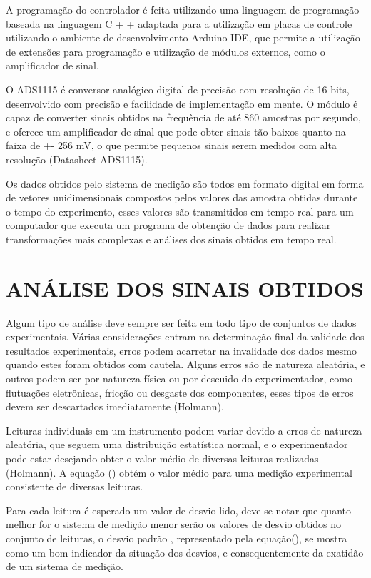 A programação do controlador é feita utilizando uma linguagem de programação baseada na linguagem C + + adaptada para a utilização em placas de controle utilizando o ambiente de desenvolvimento Arduino IDE, que permite a utilização de extensões para programação e utilização de módulos externos, como o amplificador de sinal.

O ADS1115 é conversor analógico digital de precisão com resolução de 16 bits, desenvolvido com precisão e facilidade de implementação em mente. O módulo é capaz de converter sinais obtidos na frequência de até 860 amostras por segundo, e oferece um amplificador de sinal que pode obter sinais tão baixos quanto na faixa de +- 256 mV, o que permite pequenos sinais serem medidos com alta resolução (Datasheet ADS1115).

Os dados obtidos pelo sistema de medição são todos em formato digital em forma de vetores unidimensionais compostos pelos valores das amostra obtidas durante o  tempo do experimento, esses valores são transmitidos em tempo real para um computador que executa um programa de obtenção de dados para realizar transformações mais complexas e análises dos sinais obtidos em tempo real.

\section{ANÁLISE DOS SINAIS OBTIDOS}

Algum tipo de análise deve sempre ser feita em todo tipo de conjuntos de dados experimentais. Várias considerações entram na determinação final da validade dos resultados experimentais, erros podem acarretar na invalidade dos dados mesmo quando estes foram obtidos com cautela. Alguns erros são de natureza aleatória, e outros podem ser por natureza física ou por descuido do experimentador, como flutuações eletrônicas, fricção ou desgaste dos componentes, esses tipos de erros devem ser descartados imediatamente (Holmann).

Leituras individuais em um instrumento podem variar devido a erros de natureza aleatória, que seguem uma distribuição estatística normal, e o experimentador pode estar desejando obter o valor médio de diversas leituras realizadas (Holmann). A equação () obtém o valor médio para uma medição experimental consistente de diversas leituras.

Para cada leitura é esperado um valor de desvio lido, deve se notar que quanto melhor for o sistema de medição menor serão os valores de desvio obtidos no conjunto de leituras, o desvio padrão , representado pela equação(), se mostra como um bom indicador da situação dos desvios, e consequentemente da exatidão de um sistema de medição.


